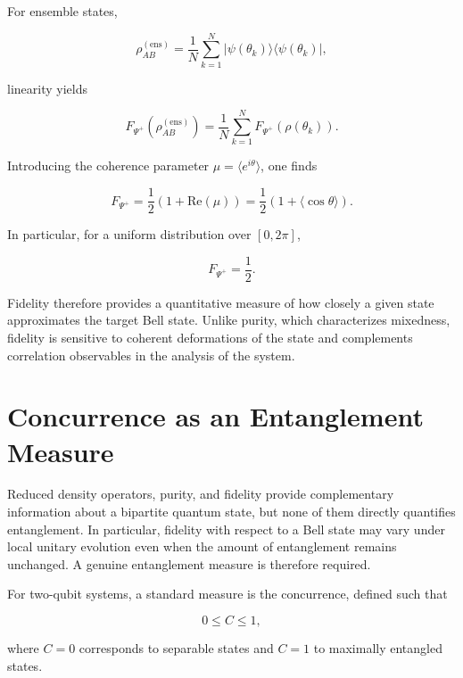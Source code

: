 For ensemble states,

\[
\rho_{AB}^{(\mathrm{ens})}
=
\frac{1}{N}
\sum_{k=1}^{N}
|\psi(\theta_k)\rangle\langle\psi(\theta_k)|,
\]

linearity yields

\[
F_{\Psi^+}
\left(
\rho_{AB}^{(\mathrm{ens})}
\right)
=
\frac{1}{N}
\sum_{k=1}^{N}
F_{\Psi^+}
\left(
\rho(\theta_k)
\right).
\]

Introducing the coherence parameter \( \mu = \langle e^{i\theta}\rangle \), one finds

\begin{equation}
F_{\Psi^+}
=
\frac{1}{2}
\left(
1+\mathrm{Re}(\mu)
\right)
=
\frac{1}{2}
\left(
1+\langle \cos\theta\rangle
\right).
\label{eq:ensemble_fidelity_psi_plus}
\end{equation}

\medskip

In particular, for a uniform distribution over \( [0,2\pi] \),

\[
F_{\Psi^+}
=
\frac{1}{2}.
\]

\medskip

Fidelity therefore provides a quantitative measure of how closely a given state approximates the target Bell state. Unlike purity, which characterizes mixedness, fidelity is sensitive to coherent deformations of the state and complements correlation observables in the analysis of the system.


\section{Concurrence as an Entanglement Measure}

Reduced density operators, purity, and fidelity provide complementary information about a bipartite quantum state, but none of them directly quantifies entanglement. In particular, fidelity with respect to a Bell state may vary under local unitary evolution even when the amount of entanglement remains unchanged. A genuine entanglement measure is therefore required.

\medskip

For two-qubit systems, a standard measure is the concurrence, defined such that

\[
0 \le C \le 1,
\]

where \( C=0 \) corresponds to separable states and \( C=1 \) to maximally entangled states.

